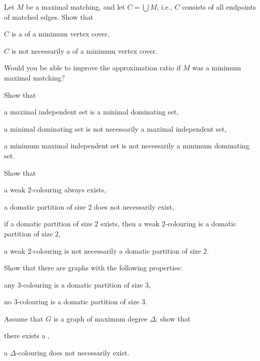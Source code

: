 \begin{ex}\label{ex:mmvc}
    Let $M$ be a maximal matching, and let $C = \bigcup M$, i.e., $C$ consists of all endpoints of matched edges. Show that
    \begin{subex}
        \item $C$ is a  of a minimum vertex cover,
        \item $C$ is not necessarily a  of a minimum vertex cover.
    \end{subex}
    Would you be able to improve the approximation ratio if $M$ was a minimum maximal matching?
\end{ex}

\begin{ex}
    Show that
    \begin{subex}
        \item a maximal independent set is a minimal dominating set,
        \item a minimal dominating set is not necessarily a maximal independent set,
        \item a minimum maximal independent set is not necessarily a minimum dominating set.
    \end{subex}
\end{ex}

\begin{ex}
    Show that
    \begin{subex}
        \item a weak $2$-colouring always exists,
        \item a domatic partition of size $2$ does not necessarily exist,
        \item if a domatic partition of size $2$ exists, then a weak $2$-colouring is a domatic partition of size $2$,
        \item a weak $2$-colouring is not necessarily a domatic partition of size $2$.
    \end{subex}
    Show that there are  graphs with the following properties:
    \begin{subex}[resume]
        \item any $3$-colouring is a domatic partition of size $3$,
        \item no $3$-colouring is a domatic partition of size $3$.
    \end{subex}
    Assume that $G$ is a graph of maximum degree $\Delta$; show that
    \begin{subex}[resume]
        \item there exists a \Dpocol,
        \item a $\Delta$-colouring does not necessarily exist.
    \end{subex}
\end{ex}

